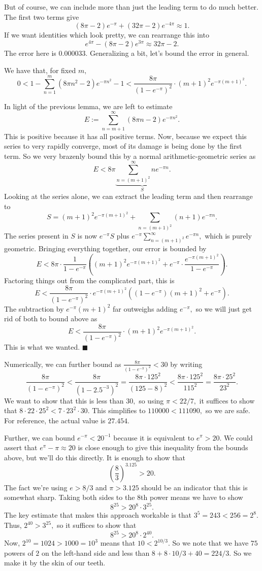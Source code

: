 But of course, we can include more than just the leading term to do much better. The first two terms give
\[(8\pi-2)e^{-\pi}+(32\pi-2)e^{-4\pi}\approx1.\]
If we want identities which look pretty, we can rearrange this into
\[e^{4\pi}-(8\pi-2)e^{3\pi}\approx32\pi-2.\]
The error here is $0.000033.$ Generalizing a bit, let's bound the error in general.
\begin{lemma}
    We have that, for fixed $m,$
    \[0<1-\sum_{n=1}^m\left(8\pi n^2-2\right)e^{-\pi n^2}-1<\frac{8\pi}{\left(1-e^{-\pi}\right)^2}\cdot(m+1)^2e^{-\pi(m+1)^2}.\]
\end{lemma}
In light of the previous lemma, we are left to estimate
\[E:=\sum_{n=m+1}^\infty(8\pi n-2)e^{-\pi n^2}.\]
This is positive because it has all positive terms. Now, because we expect this series to very rapidly converge, most of its damage is being done by the first term. So we very brazenly bound this by a normal arithmetic-geometric series as
\[E<8\pi\underbrace{\sum_{n=(m+1)^2}^\infty ne^{-\pi n}}_S.\]
Looking at the series alone, we can extract the leading term and then rearrange to
\[S=(m+1)^2e^{-\pi(m+1)^2}+\sum_{n=(m+1)^2}(n+1)e^{-\pi n}.\]
The series present in $S$ is now $e^{-\pi}S$ plus $e^{-\pi}\sum_{n=(m+1)^2}^\infty e^{-\pi n},$ which is purely geometric. Bringing everything together, our error is bounded by
\[E<8\pi\cdot\frac1{1-e^{-\pi}}\left((m+1)^2e^{-\pi(m+1)^2}+e^{-\pi}\cdot\frac{e^{-\pi(m+1)^2}}{1-e^{-\pi}}\right).\]
Factoring things out from the complicated part, this is
\[E<\frac{8\pi}{\left(1-e^{-\pi}\right)^2}\cdot e^{-\pi(m+1)^2}\left(\left(1-e^{-\pi}\right)(m+1)^2+e^{-\pi}\right).\]
The subtraction by $e^{-\pi}(m+1)^2$ far outweighs adding $e^{-\pi},$ so we will just get rid of both to bound above as
\[E<\frac{8\pi}{\left(1-e^{-\pi}\right)^2}\cdot(m+1)^2e^{-\pi(m+1)^2}.\]
This is what we wanted. $\blacksquare$

Numerically, we can further bound as $\frac{8\pi}{\left(1-e^{-\pi}\right)^2}<30$ by writing
\[\frac{8\pi}{\left(1-e^{-\pi}\right)^2}<\frac{8\pi}{\left(1-2.5^{-3}\right)^2}=\frac{8\pi\cdot125^{2}}{\left(125-8\right)^2}<\frac{8\pi\cdot125^2}{115^2}=\frac{8\pi\cdot25^2}{23^2}.\]
We want to show that this is less than $30,$ so using $\pi<22/7,$ it suffices to show that $8\cdot22\cdot25^2<7\cdot23^2\cdot30.$ This simplifies to $110000<111090,$ so we are safe. For reference, the actual value is $27.454.$

Further, we can bound $e^{-\pi}<20^{-1}$ because it is equivalent to $e^\pi>20.$ We could assert that $e^\pi-\pi\approx20$ is close enough to give this inequality from the bounds above, but we'll do this directly. It is enough to show that
\[\left(\frac83\right)^{3.125}>20.\]
The fact we're using $e>8/3$ and $\pi>3.125$ should be an indicator that this is somewhat sharp. Taking both sides to the $8$th power means we have to show
\[8^{25}>20^8\cdot3^{25}.\]
The key estimate that makes this approach workable is that $3^5=243<256=2^8.$ Thus, $2^{40}>3^{25},$ so it suffices to show that
\[8^{25}>20^8\cdot2^{40}.\]
Now, $2^{10}=1024>1000=10^3$ means that $10<2^{10/3}.$ So we note that we have $75$ powers of $2$ on the left-hand side and less than $8+8\cdot10/3+40=224/3.$ So we make it by the skin of our teeth.

